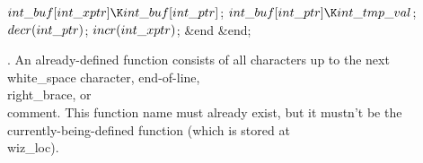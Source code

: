 $\\{int\_buf}[\\{int\_xptr}]\K\\{int\_buf}[\\{int\_ptr}]$;\5
$\\{int\_buf}[\\{int\_ptr}]\K\\{int\_tmp\_val}$;\5
$\\{decr}(\\{int\_ptr})$;\5
$\\{incr}(\\{int\_xptr})$;\6
\&{end}\2\6
\&{end};\par
\fi

.
An already-defined function consists of all characters up to the next
\\{white\_space} character, end-of-line, \\{right\_brace}, or \\{comment}.
This function name must already exist, but it mustn't be the
currently-being-defined function (which is stored at \\{wiz\_loc}).

